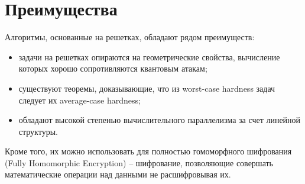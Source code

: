 \section{Преимущества}

Алгоритмы, основанные на решетках, обладают рядом преимуществ:
\begin{itemize}
	\item задачи на решетках опираются на геометрические свойства, вычисление которых хорошо сопротивляются квантовым атакам;
	\item существуют теоремы, доказывающие, что из worst-case hardness задач следует их average-case hardness;
	\item обладают высокой степенью вычислительного параллелизма за счет линейной структуры.
\end{itemize}

Кроме того, их можно использовать для полностью гомоморфного шифрования (Fully Homomorphic Encryption) -- шифрование, позволяющие совершать математические операции над данными не расшифровывая их.

\endinput